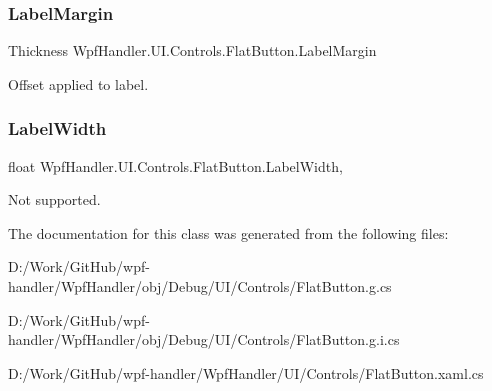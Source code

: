 \subsubsection{\texorpdfstring{Label\+Margin}{LabelMargin}}
{\footnotesize\ttfamily Thickness Wpf\+Handler.\+U\+I.\+Controls.\+Flat\+Button.\+Label\+Margin\hspace{0.3cm}{\ttfamily [get]}}



Offset applied to label. 

\mbox{\label{class_wpf_handler_1_1_u_i_1_1_controls_1_1_flat_button_ad8f23ebbd9a85097d01940f80d372217}} 
\subsubsection{\texorpdfstring{Label\+Width}{LabelWidth}}
{\footnotesize\ttfamily float Wpf\+Handler.\+U\+I.\+Controls.\+Flat\+Button.\+Label\+Width\hspace{0.3cm}{\ttfamily [get]}, {\ttfamily [set]}}



Not supported. 



The documentation for this class was generated from the following files\+:\begin{DoxyCompactItemize}
\item 
D\+:/\+Work/\+Git\+Hub/wpf-\/handler/\+Wpf\+Handler/obj/\+Debug/\+U\+I/\+Controls/Flat\+Button.\+g.\+cs\item 
D\+:/\+Work/\+Git\+Hub/wpf-\/handler/\+Wpf\+Handler/obj/\+Debug/\+U\+I/\+Controls/Flat\+Button.\+g.\+i.\+cs\item 
D\+:/\+Work/\+Git\+Hub/wpf-\/handler/\+Wpf\+Handler/\+U\+I/\+Controls/Flat\+Button.\+xaml.\+cs\end{DoxyCompactItemize}
